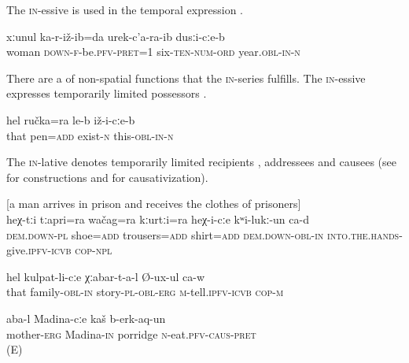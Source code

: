The \textsc{in}-essive is used in the temporal expression  .
%
\begin{exe}
	\ex	\label{I married in 1960}
	\gll	xːunul	ka-r-iž-ib=da	urek-c'a-ra-ib	dusːi-cːe-b\\
		woman	\textsc{down}-\textsc{f}-be.\textsc{pfv}-\textsc{pret}=1	six-\textsc{ten-num}-\textsc{ord}	year.\textsc{obl}-\textsc{in}-\textsc{n}\\
	\glt	{}
\end{exe}

There are a  of non-spatial functions that the \textsc{in}-series fulfills. The \textsc{in}-essive expresses temporarily limited possessors .
%
\begin{exe}
	\ex	\label{He has a pen (in his hands}
	\gll	hel	ručka=ra	le-b	iž-i-cːe-b \\
		that	pen=\textsc{add}	exist-\textsc{n}	this-\textsc{obl-in}-\textsc{n}\\
	\glt	{}
\end{exe}

The \textsc{in}-lative denotes temporarily limited recipients , addressees  and causees  (see  for  constructions and  for causativization).
%
\begin{exe}
	\ex	 \label{the shoes, the trousers, the shirt is handed over to him}
	[a man arrives in prison and receives the clothes of prisoners]\\
	\gll	heχ-tːi	tːapri=ra	wačag=ra	kːurtːi=ra	heχ-i-cːe	kʷi-lukː-un ca-d\\
		\textsc{dem.down}-\textsc{pl}	shoe=\textsc{add}	trousers=\textsc{add}	shirt=\textsc{add}	\textsc{dem.down}-\textsc{obl-in}	\textsc{into.the.hands}-give.\textsc{ipfv}-\textsc{icvb} \textsc{cop-npl}\\
	\glt	{}

	\ex	\label{He is telling the stories to his family}
	\gll	hel	kulpat-li-cːe	χːabar-t-a-l	Ø-ux-ul ca-w \\
		that	family-\textsc{obl-in}	story-\textsc{pl}-\textsc{obl}-\textsc{erg}	\textsc{m}-tell.\textsc{ipfv}-\textsc{icvb} \textsc{cop-m}\\
	\glt	{}
	
	\ex	\label{Mother made Madina eat porridge}
	\gll	aba-l	Madina-cːe	kaš	b-erk-aq-un\\
		mother-\textsc{erg}	Madina-\textsc{in}	porridge	\textsc{n}-eat.\textsc{pfv}-\textsc{caus}-\textsc{pret}\\
	\glt	{} (E)
\end{exe}

